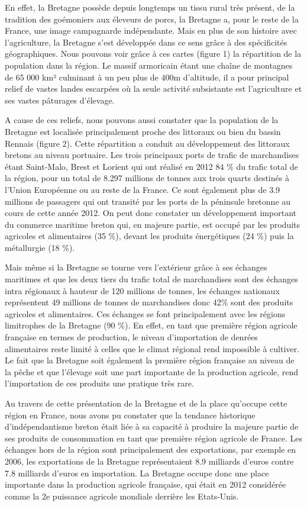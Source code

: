 \documentclass[a4paper,10pt]{report}
\begin{document}
			En effet, la Bretagne possède depuis longtemps un tissu rural très présent, de la tradition des goémoniers aux éleveurs de porcs, la Bretagne a, pour le reste de la France, une image campagnarde indépendante. Mais en plus de son histoire avec l’agriculture, la Bretagne s’est développée dans ce sens grâce à des spécificités géographiques. Nous pouvons voir grâce à ces cartes (figure 1) la répartition de la population dans la région. Le massif armoricain étant une chaîne de montagnes de 65 000 km² culminant à un peu plus de 400m d’altitude, il a pour principal relief de vastes landes escarpées où la seule activité subsistante est l’agriculture et ses vastes pâturages d’élevage.
			
			A cause de ces reliefs, nous pouvons aussi constater que la population de la Bretagne est localisée principalement proche des littoraux ou bien du bassin Rennais (figure 2). Cette répartition a conduit au développement des littoraux bretons au niveau portuaire. Les trois principaux ports de trafic de marchandises étant Saint-Malo, Brest et Lorient qui ont réalisé en 2012 84 \% du trafic total de la région, pour un total de 8.297 millions de tonnes aux trois quarts destinés à l’Union Européenne ou au reste de la France. Ce sont également plus de 3.9 millions de passagers qui ont transité par les ports de la péninsule bretonne au cours de cette année 2012. On peut donc constater un développement important du commerce maritime breton qui, en majeure partie, est occupé par les produits agricoles et alimentaires (35 \%), devant les produits énergétiques (24 \%) puis la métallurgie (18 \%).
			
			Mais même si la Bretagne se tourne vers l’extérieur grâce à ses échanges maritimes et que les deux tiers du trafic total de marchandises sont des échanges intra régionaux à hauteur de 120 millions de tonnes, les échanges nationaux représentent 49 millions de tonnes de marchandises donc 42\% sont des produits agricoles et alimentaires. Ces échanges se font principalement avec les régions limitrophes de la Bretagne (90 \%). En effet, en tant que première région agricole française en termes de production, le niveau d’importation de denrées alimentaires reste limité à celles que le climat régional rend impossible à cultiver. Le fait que la Bretagne soit également la première région française au niveau de la pêche et que l’élevage soit une part importante de la production agricole, rend l’importation de ces produits une pratique très rare.
			
			Au travers de cette présentation de la Bretagne et de la place qu’occupe cette région en France, nous avons pu constater que la tendance historique d’indépendantisme breton était liée à sa capacité à produire la majeure partie de ses produits de consommation en tant que première région agricole de France. Les échanges hors de la région sont principalement des exportations, par exemple en 2006, les exportations de la Bretagne représentaient 8.9 milliards d’euros contre 7.8 milliards d’euros en importation. La Bretagne occupe donc une place importante dans la production agricole française, qui était en 2012 considérée comme la 2e puissance agricole mondiale derrière les Etats-Unis.
			
\end{document}
